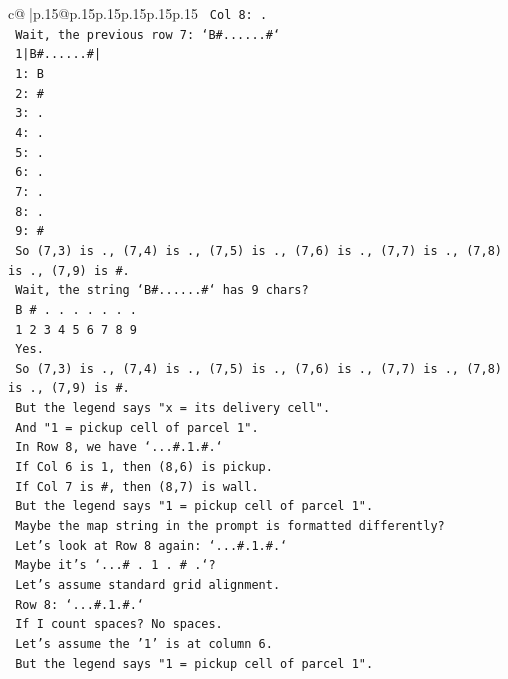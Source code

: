 \documentclass{article}
\begin{document}
{\begin{supertabular}{c@{$\;$}|p{.15\linewidth}@{}p{.15\linewidth}p{.15\linewidth}p{.15\linewidth}p{.15\linewidth}p{.15\linewidth}}
{{{\texttt{   Col 8: .} \\
\texttt{   Wait, the previous row 7: `B\#......\#`} \\
\texttt{   1|B\#......\#|} \\
\texttt{   1: B} \\
\texttt{   2: \#} \\
\texttt{   3: .} \\
\texttt{   4: .} \\
\texttt{   5: .} \\
\texttt{   6: .} \\
\texttt{   7: .} \\
\texttt{   8: .} \\
\texttt{   9: \#} \\
\texttt{   So (7,3) is ., (7,4) is ., (7,5) is ., (7,6) is ., (7,7) is ., (7,8) is ., (7,9) is \#.} \\
\texttt{   Wait, the string `B\#......\#` has 9 chars?} \\
\texttt{   B \# . . . . . . .} \\
\texttt{   1 2 3 4 5 6 7 8 9} \\
\texttt{   Yes.} \\
\texttt{   So (7,3) is ., (7,4) is ., (7,5) is ., (7,6) is ., (7,7) is ., (7,8) is ., (7,9) is \#.} \\
\texttt{   But the legend says "x = its delivery cell".} \\
\texttt{   And "1 = pickup cell of parcel 1".} \\
\texttt{   In Row 8, we have `...\#.1.\#.`} \\
\texttt{   If Col 6 is 1, then (8,6) is pickup.} \\
\texttt{   If Col 7 is \#, then (8,7) is wall.} \\
\texttt{   But the legend says "1 = pickup cell of parcel 1".} \\
\texttt{   Maybe the map string in the prompt is formatted differently?} \\
\texttt{   Let's look at Row 8 again: `...\#.1.\#.`} \\
\texttt{   Maybe it's `...\# . 1 . \# .`?} \\
\texttt{   Let's assume standard grid alignment.} \\
\texttt{   Row 8: `...\#.1.\#.`} \\
\texttt{   If I count spaces? No spaces.} \\
\texttt{   Let's assume the '1' is at column 6.} \\
\texttt{   But the legend says "1 = pickup cell of parcel 1".} \\
}}}
\end{supertabular}}
\end{document}
